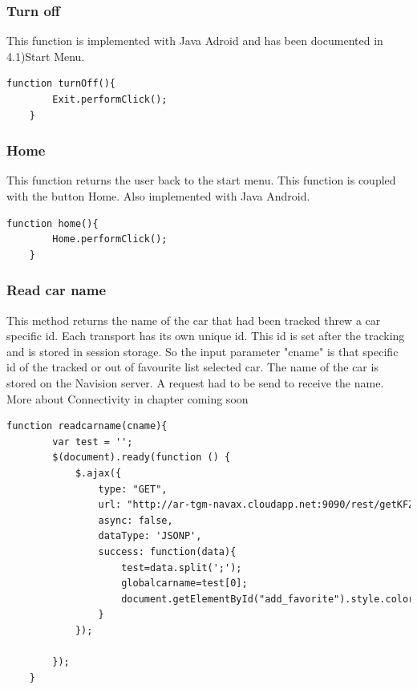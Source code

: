 \subsubsection{Turn off}
This function is implemented with Java Adroid and has been documented in 4.1)Start Menu.
\\

\begin{lstlisting}[language=html, caption= 
start timer function,captionpos=b]
function turnOff(){
        Exit.performClick();
    }
\end{lstlisting}



\subsubsection{Home}
This function returns the user back to the start menu. This function is coupled with the button Home. Also implemented with Java Android.
\\

\begin{lstlisting}[language=html, caption= 
start timer function,captionpos=b]
function home(){
        Home.performClick();
    }
\end{lstlisting}


\subsubsection{Read car name}
This method returns the name of the car that had been tracked threw a car specific id. Each transport has its own unique id. This id is set after the tracking and is stored in session storage.  So the input parameter "cname" is that specific id of the tracked or out of favourite list selected car. The name of the car is stored on the Navision server. A request had to be send to receive the name. More about Connectivity in chapter coming soon 
\\

\begin{lstlisting}[language=html, caption= 
start timer function,captionpos=b]
function readcarname(cname){
        var test = '';
        $(document).ready(function () {
            $.ajax({
                type: "GET",
                url: "http://ar-tgm-navax.cloudapp.net:9090/rest/getKFZInfo/"+cname+"/ac73f229f1fb88a8719e5f6d295bee45?callback=?",
                async: false,
                dataType: 'JSONP',
                success: function(data){
                    test=data.split(';');
                    globalcarname=test[0];
					document.getElementById("add_favorite").style.color="black";
                }
            });

        });
    }
\end{lstlisting}


